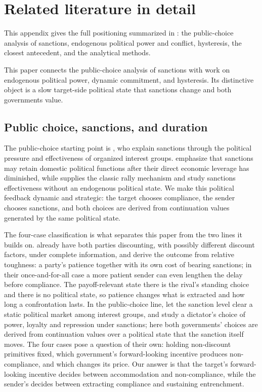 \section{Related literature in detail}
\label{app:literature}

This appendix gives the full positioning summarized in : the public-choice
analysis of sanctions, endogenous political power and conflict, hysteresis, the closest
antecedent, and the analytical methods.

This paper connects the public-choice analysis of sanctions with work on
endogenous political power, dynamic commitment, and hysteresis. Its
distinctive object is a slow target-side political state that sanctions
change and both governments value.

\subsection{Public choice, sanctions, and duration}

The public-choice starting point is \citet{Kaempfer1988}, who explain
sanctions through the political pressure and effectiveness of organized
interest groups.
\citet{HalcoussisKaempferLowenberg2021} emphasize that sanctions may
retain domestic political functions after their direct economic
leverage has diminished, while \citet{Galtung1967} supplies the classic
rally mechanism and \citet{Eaton1992} study sanctions effectiveness
without an endogenous political state. We make this political feedback
dynamic and strategic: the target chooses compliance, the sender
chooses sanctions, and both choices are derived from continuation
values generated by the same political state.

The four-case classification is what separates this paper from the two lines it
builds on. \citet{Eaton1992} already have both parties discounting, with
possibly different discount factors, under complete information, and derive
the outcome from relative toughness: a party's patience together with its
own cost of bearing sanctions; in their once-and-for-all case a more patient
sender can even lengthen the delay before compliance. The payoff-relevant
state there is the rival's standing choice and there is no political state, so
patience changes what is extracted and how long a confrontation lasts. In the public-choice
line, \citet{Kaempfer1988}
let the sanction level clear a static political market among interest
groups, and \citet{KaempferLowenbergMertens2004} study a dictator's choice of
power, loyalty and repression under sanctions; here both governments'
choices are derived from continuation values over a political state that the
sanction itself moves. The four cases pose a question of their own: holding
non-discount primitives fixed, which
government's forward-looking incentive produces non-compliance, and which changes its
price. Our answer is that the target's forward-looking incentive decides between
accommodation and non-compliance, while the sender's decides between extracting
compliance and sustaining entrenchment.

